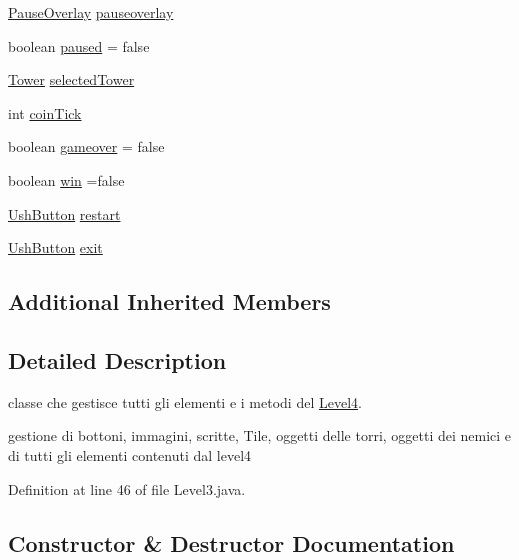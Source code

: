 \begin{DoxyCompactItemize}
\hyperlink{classui_1_1_pause_overlay}{Pause\+Overlay} \hyperlink{classscenes_1_1_level3_a544fb9294d892e35b4b0316e07997cd6}{pauseoverlay}
\item 
boolean \hyperlink{classscenes_1_1_level3_aa1e43f4bcbc826434b83c0f3ec507143}{paused} = false
\item 
\hyperlink{classtowers_1_1_tower}{Tower} \hyperlink{classscenes_1_1_level3_af6b1162bc2f00f8d549aae075ddd5a8b}{selected\+Tower}
\item 
int \hyperlink{classscenes_1_1_level3_aa48bc6c9a2648651d6484c9063ca1b8f}{coin\+Tick}
\item 
boolean \hyperlink{classscenes_1_1_level3_a962cec751fe966ea7bf381c68ab5c70f}{gameover} = false
\item 
boolean \hyperlink{classscenes_1_1_level3_a1cc7b399bb950a160021766cd9a126f8}{win} =false
\item 
\hyperlink{classui_1_1_ush_button}{Ush\+Button} \hyperlink{classscenes_1_1_level3_ac1d34384911014e49613ccfb1abddbcc}{restart}
\item 
\hyperlink{classui_1_1_ush_button}{Ush\+Button} \hyperlink{classscenes_1_1_level3_a08590df28bf721b1cf1670cf0f8f7341}{exit}
\end{DoxyCompactItemize}
\subsection*{Additional Inherited Members}


\subsection{Detailed Description}
classe che gestisce tutti gli elementi e i metodi del \hyperlink{classscenes_1_1_level4}{Level4}. 

gestione di bottoni, immagini, scritte, Tile, oggetti delle torri, oggetti dei nemici e di tutti gli elementi contenuti dal level4 

Definition at line 46 of file Level3.\+java.



\subsection{Constructor \& Destructor Documentation}
\mbox{\label{classscenes_1_1_level3_a0f56949b20e6eda500c5b9c50e16de58}} 
